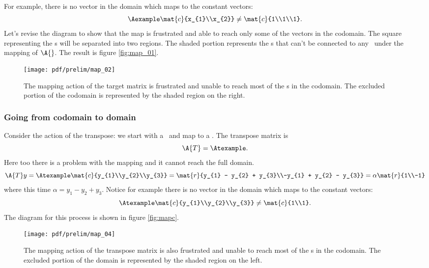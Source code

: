 For example, there is no vector in the domain which maps to the constant vectors:
\begin{equation}
  \Aexample \mat{c}{x_{1}\\x_{2}} \ne \mat{c}{1\\1\\1}.
\end{equation}
Let's revise the diagram to show that the map is frustrated and able to reach only some of the vectors in the codomain. The square representing the \vvv s will be separated into two regions. The shaded portion represents the \vvv s that can't be connected to any \vv \ under the mapping of $\A{}$. The result is figure \eqref{fig:map_01}.
\begin{figure}[htbp] %
   \centering
   \texttt{[image: pdf/prelim/map\_02]} 
   \caption{The mapping action of the target matrix is frustrated and unable to reach most of the \vvv s in the codomain. The excluded portion of the codomain is represented by the shaded region on the right.}
   \label{fig:map_01}
\end{figure}

\subsubsection{Going from codomain to domain}
Consider the action of the transpose: we start with a \vvv \  and map to a \vv. The transpose matrix is
\begin{equation}
  \A{T}= \Atexample.
\end{equation}
Here too there is a problem with the mapping and it cannot reach the full domain.
\begin{equation}
  \A{T} y = \Atexample \mat{c}{y_{1}\\y_{2}\\y_{3}} = \mat{r}{y_{1} - y_{2} + y_{3}\\-y_{1} + y_{2} - y_{3}} = \alpha\mat{r}{1\\-1}
\end{equation}
where this time $\alpha = y_{1}-y_{2}+y_{3}$. Notice for example there is no vector in the domain which maps to the constant vectors:
\begin{equation}
  \Atexample \mat{c}{y_{1}\\y_{2}\\y_{3}} \ne \mat{c}{1\\1}.
\end{equation}
The diagram for this process is shown in figure \eqref{fig:mapc}.
\begin{figure}[htbp] %
   \centering
   \texttt{[image: pdf/prelim/map\_04]} 
   \caption{The mapping action of the transpose matrix is also frustrated and unable to reach most of the \vv s in the codomain. The excluded portion of the domain is represented by the shaded region on the left.}
   \label{fig:mapc}
\end{figure}

